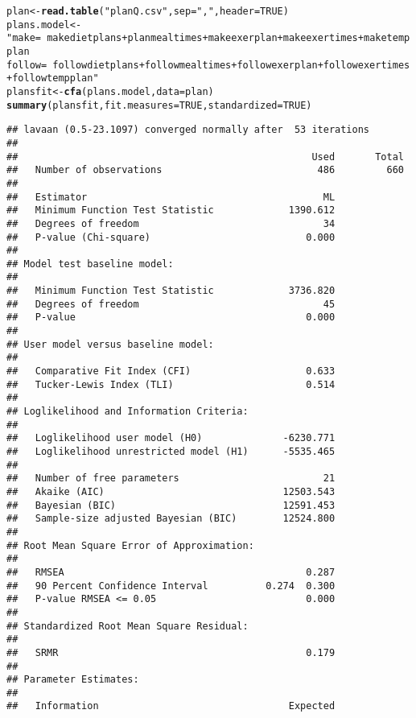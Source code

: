 \documentclass{article}\usepackage[]{graphicx}\usepackage[]{color}
\makeatletter
\newcommand{\hlnum}[1]{\textcolor[rgb]{0.686,0.059,0.569}{#1}}%
\newcommand{\hlstr}[1]{\textcolor[rgb]{0.192,0.494,0.8}{#1}}%
\newcommand{\hlstd}[1]{\textcolor[rgb]{0.345,0.345,0.345}{#1}}%
\newcommand{\hlkwb}[1]{\textcolor[rgb]{0.69,0.353,0.396}{#1}}%
\newcommand{\hlkwc}[1]{\textcolor[rgb]{0.333,0.667,0.333}{#1}}%
\newcommand{\hlkwd}[1]{\textcolor[rgb]{0.737,0.353,0.396}{\textbf{#1}}}%
\newenvironment{kframe}{%
 \def\at@end@of@kframe{}%
 \ifinner\ifhmode%
  \def\at@end@of@kframe{\end{minipage}}%
  \begin{minipage}{\columnwidth}%
 \fi\fi%
 \def\FrameCommand##1{\hskip\@totalleftmargin \hskip-\fboxsep
 \colorbox{shadecolor}{##1}\hskip-\fboxsep
     \hskip-\linewidth \hskip-\@totalleftmargin \hskip\columnwidth}%
 \MakeFramed {\advance\hsize-\width
   \@totalleftmargin\z@ \linewidth\hsize
   \@setminipage}}%
 {\par\unskip\endMakeFramed%
 \at@end@of@kframe}
\newenvironment{knitrout}{}{} %
\makeatother
\begin{document}
\begin{knitrout}
\color{fgcolor}\begin{kframe}
\begin{alltt}
\hlstd{plan} \hlkwb{<-} \hlkwd{read.table}\hlstd{(}\hlstr{"planQ.csv"}\hlstd{,} \hlkwc{sep} \hlstd{=} \hlstr{","}\hlstd{,} \hlkwc{header} \hlstd{=} \hlnum{TRUE}\hlstd{)}
\hlstd{plans.model} \hlkwb{<-} \hlstr{" make  =~ makedietplans + planmealtimes + makeexerplan +  makeexertimes + maketempplan     
              follow =~ followdietplans + followmealtimes + followexerplan + followexertimes + followtempplan"}
\hlstd{plansfit} \hlkwb{<-} \hlkwd{cfa}\hlstd{(plans.model,} \hlkwc{data} \hlstd{= plan)}
\hlkwd{summary}\hlstd{(plansfit,} \hlkwc{fit.measures} \hlstd{=} \hlnum{TRUE}\hlstd{,} \hlkwc{standardized} \hlstd{=} \hlnum{TRUE}\hlstd{)}
\end{alltt}
\begin{verbatim}
## lavaan (0.5-23.1097) converged normally after  53 iterations
## 
##                                                   Used       Total
##   Number of observations                           486         660
## 
##   Estimator                                         ML
##   Minimum Function Test Statistic             1390.612
##   Degrees of freedom                                34
##   P-value (Chi-square)                           0.000
## 
## Model test baseline model:
## 
##   Minimum Function Test Statistic             3736.820
##   Degrees of freedom                                45
##   P-value                                        0.000
## 
## User model versus baseline model:
## 
##   Comparative Fit Index (CFI)                    0.633
##   Tucker-Lewis Index (TLI)                       0.514
## 
## Loglikelihood and Information Criteria:
## 
##   Loglikelihood user model (H0)              -6230.771
##   Loglikelihood unrestricted model (H1)      -5535.465
## 
##   Number of free parameters                         21
##   Akaike (AIC)                               12503.543
##   Bayesian (BIC)                             12591.453
##   Sample-size adjusted Bayesian (BIC)        12524.800
## 
## Root Mean Square Error of Approximation:
## 
##   RMSEA                                          0.287
##   90 Percent Confidence Interval          0.274  0.300
##   P-value RMSEA <= 0.05                          0.000
## 
## Standardized Root Mean Square Residual:
## 
##   SRMR                                           0.179
## 
## Parameter Estimates:
## 
##   Information                                 Expected

\end{verbatim}
\end{kframe}
\end{knitrout}
\end{document}
